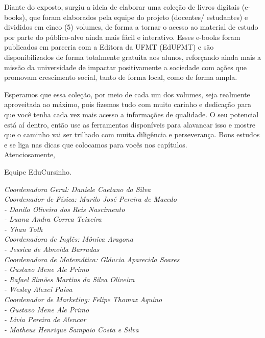 Diante do exposto, surgiu a ideia de elaborar uma coleção de livros 
digitais (e-books), que foram elaborados pela equipe do projeto (docentes/
estudantes) e divididos em cinco (5) volumes, de forma a tornar o acesso 
ao material de estudo por parte do público-alvo ainda mais fácil e 
interativo. Esses e-books foram publicados em parceria com a Editora da 
UFMT (EdUFMT) e são disponibilizados de forma totalmente gratuita aos 
alunos, reforçando ainda mais a missão da universidade de impactar 
positivamente a sociedade com ações que promovam crescimento social, tanto 
de forma local, como de forma ampla. 

Esperamos que essa coleção, por meio de cada um dos volumes, seja 
realmente aproveitada ao máximo, pois fizemos tudo com muito carinho e 
dedicação para que você tenha cada vez mais acesso a informações de 
qualidade. O seu potencial está aí dentro, então use as ferramentas 
disponíveis para alavancar isso e mostre que o caminho vai ser trilhado 
com muita diligência e perseverança. Bons estudos e se liga nas dicas que 
colocamos para vocês nos capítulos.\\

\noindent
Atenciosamente,

\hspace*{\fill} Equipe EduCursinho.


\vfill
\noindent
\textit{Coordenadora Geral: Daniele Caetano da Silva}\\

\noindent
\textit{Coordenador de Física: Murilo José Pereira de Macedo}\\
\textit{- Danilo Oliveira dos Reis Nascimento}\\
\textit{- Luana Andra Correa Teixeira}\\
\textit{- Yhan Toth}\\

\noindent
\textit{Coordenadora de Inglês: Mônica Aragona}\\
\textit{- Jessica de Almeida Barradas}\\   

\noindent
\textit{Coordenadora de Matemática: Gláucia Aparecida Soares}\\
\textit{- Gustavo Mene Ale Primo}\\
\textit{- Rafael Simões Martins da Silva Oliveira}\\
\textit{- Wesley Alexei Paiva}\\

\noindent
\textit{Coordenador de Marketing: Felipe Thomaz Aquino}\\
\textit{- Gustavo Mene Ale Primo}\\
\textit{- Livia Pereira de Alencar}\\
\textit{- Matheus Henrique Sampaio Costa e Silva}\\


